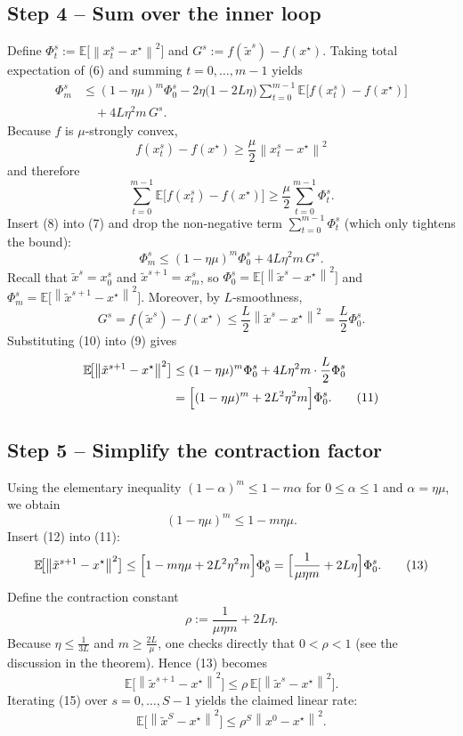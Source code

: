 \documentclass[11pt]{article}
\newcommand{\E}{\mathbb{E}}
\newcommand{\norm}[1]{\left\|#1\right\|}
\begin{document}
\subsection*{Step 4 – Sum over the inner loop}
Define $\Phi_t^{s}:=\E\bigl[\norm{x_{t}^{s}-x^{\star}}^{2}\bigr]$ and $G^{s}:=f(\tilde{x}^{s})-f(x^{\star})$.  
Taking total expectation of (6) and summing $t=0,\dots,m-1$ yields
\[
\begin{aligned}
\Phi_{m}^{s}
&\le (1-\eta\mu)^{m}\Phi_{0}^{s}
   -2\eta\bigl(1-2L\eta\bigr)\sum_{t=0}^{m-1}\E\!\bigl[f(x_{t}^{s})-f(x^{\star})\bigr]\\
&\quad +4L\eta^{2}m\,G^{s}. \tag{7}
\end{aligned}
\]
Because $f$ is $\mu$‑strongly convex,
\[
f(x_{t}^{s})-f(x^{\star})\ge \frac{\mu}{2}\norm{x_{t}^{s}-x^{\star}}^{2}
\]
and therefore
\[
\sum_{t=0}^{m-1}\E\!\bigl[f(x_{t}^{s})-f(x^{\star})\bigr]\ge
\frac{\mu}{2}\sum_{t=0}^{m-1}\Phi_{t}^{s}. \tag{8}
\]
Insert (8) into (7) and drop the non‑negative term $\sum_{t=0}^{m-1}\Phi_{t}^{s}$ (which only tightens the bound):
\[
\Phi_{m}^{s}\le (1-\eta\mu)^{m}\Phi_{0}^{s}+4L\eta^{2}m\,G^{s}. \tag{9}
\]
Recall that $\tilde{x}^{s}=x_{0}^{s}$ and $\tilde{x}^{s+1}=x_{m}^{s}$, so $\Phi_{0}^{s}= \E\!\bigl[\norm{\tilde{x}^{s}-x^{\star}}^{2}\bigr]$ and $\Phi_{m}^{s}= \E\!\bigl[\norm{\tilde{x}^{s+1}-x^{\star}}^{2}\bigr]$.  Moreover, by $L$‑smoothness,
\[
G^{s}=f(\tilde{x}^{s})-f(x^{\star})
\le \frac{L}{2}\norm{\tilde{x}^{s}-x^{\star}}^{2}
= \frac{L}{2}\Phi_{0}^{s}. \tag{10}
\]
Substituting (10) into (9) gives
\[
\begin{aligned}
\E\!\bigl[\norm{\tilde{x}^{s+1}-x^{\star}}^{2}\bigr]
&\le (1-\eta\mu)^{m}\Phi_{0}^{s}+4L\eta^{2}m\cdot\frac{L}{2}\Phi_{0}^{s}\\
&= \Bigl[(1-\eta\mu)^{m}+2L^{2}\eta^{2}m\Bigr]\Phi_{0}^{s}. \tag{11}
\end{aligned}
\]
\subsection*{Step 5 – Simplify the contraction factor}
Using the elementary inequality $(1-\alpha)^{m}\le 1-m\alpha$ for $0\le\alpha\le1$ and $\alpha=\eta\mu$, we obtain
\[
(1-\eta\mu)^{m}\le 1-m\eta\mu .\tag{12}
\]
Insert (12) into (11):
\[
\E\!\bigl[\norm{\tilde{x}^{s+1}-x^{\star}}^{2}\bigr]
\le \Bigl[1-m\eta\mu+2L^{2}\eta^{2}m\Bigr]\Phi_{0}^{s}
= \Bigl[\frac{1}{\mu\eta m}+2L\eta\Bigr]\Phi_{0}^{s}. \tag{13}
\]
Define the contraction constant
\[
\rho:=\frac{1}{\mu\eta m}+2L\eta. \tag{14}
\]
Because $\eta\le\frac{1}{3L}$ and $m\ge\frac{2L}{\mu}$, one checks directly that $0<\rho<1$ (see the discussion in the theorem).  Hence (13) becomes
\[
\E\!\bigl[\norm{\tilde{x}^{s+1}-x^{\star}}^{2}\bigr]\le\rho\,\E\!\bigl[\norm{\tilde{x}^{s}-x^{\star}}^{2}\bigr]. \tag{15}
\]
Iterating (15) over $s=0,\dots,S-1$ yields the claimed linear rate:
\[
\E\!\bigl[\norm{\tilde{x}^{S}-x^{\star}}^{2}\bigr]\le\rho^{S}\norm{x^{0}-x^{\star}}^{2}. \tag{16}
\]
\end{document}
